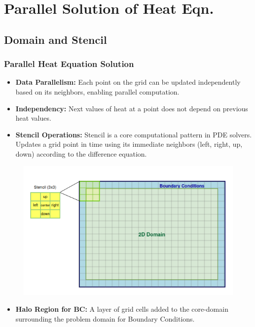 \documentclass[9pt]{beamer}
\begin{document}
\section{Parallel Solution of Heat Eqn.}

\subsection{Domain and Stencil}
\begin{frame}
\frametitle{Parallel Heat Equation Solution}
\vspace{-0.5\baselineskip}
\scriptsize
    \begin{itemize}
        \item \textbf{Data Parallelism:} Each point on the grid can be updated independently based on its neighbors, enabling parallel computation.
        \item \textbf{Independency:} Next values of heat at a point does not depend on previous heat values.
        \item \textbf{Stencil Operations:} Stencil is a core computational pattern in PDE solvers. Updates a grid point in time using its immediate neighbors (left, right, up, down) according to the difference equation.
    \end{itemize}
    \vspace{-0.5\baselineskip}
    \begin{figure}
        \centering
        \includegraphics[width=0.6\linewidth]{Screenshot from 2024-08-30 14-18-30.png}
        \label{fig:enter-label}
    \end{figure}
    \begin{itemize}
        \item \textbf{Halo Region for BC:} A layer of grid cells added to the core-domain surrounding the problem domain for Boundary Conditions.
       \end{itemize}

\end{frame}
\end{document}
